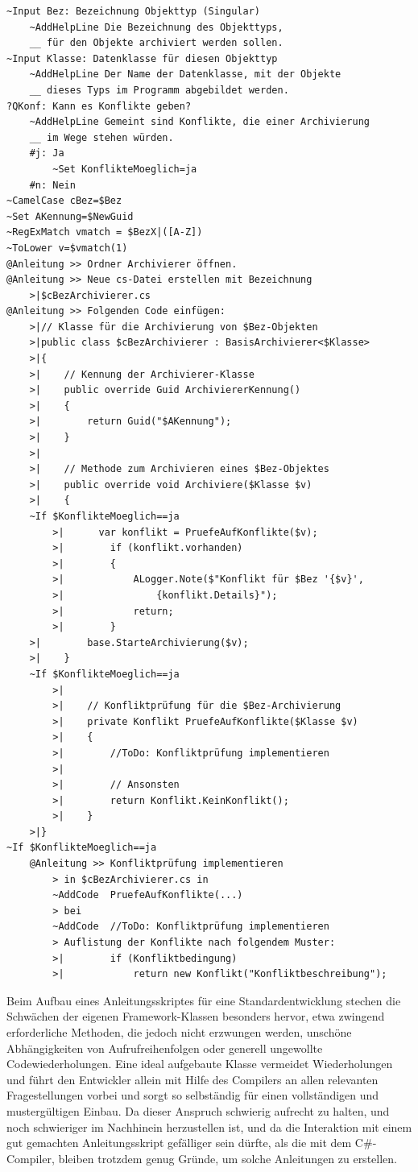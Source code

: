 \label{Archivklasse2}
\begin{verbatim}
~Input Bez: Bezeichnung Objekttyp (Singular)
    ~AddHelpLine Die Bezeichnung des Objekttyps,
    __ für den Objekte archiviert werden sollen.
~Input Klasse: Datenklasse für diesen Objekttyp
    ~AddHelpLine Der Name der Datenklasse, mit der Objekte
    __ dieses Typs im Programm abgebildet werden.
?QKonf: Kann es Konflikte geben?
    ~AddHelpLine Gemeint sind Konflikte, die einer Archivierung
    __ im Wege stehen würden.
    #j: Ja
        ~Set KonflikteMoeglich=ja
    #n: Nein
~CamelCase cBez=$Bez
~Set AKennung=$NewGuid
~RegExMatch vmatch = $BezX|([A-Z])
~ToLower v=$vmatch(1)
@Anleitung >> Ordner Archivierer öffnen.
@Anleitung >> Neue cs-Datei erstellen mit Bezeichnung
    >|$cBezArchivierer.cs
@Anleitung >> Folgenden Code einfügen:
    >|// Klasse für die Archivierung von $Bez-Objekten
    >|public class $cBezArchivierer : BasisArchivierer<$Klasse>
    >|{
    >|    // Kennung der Archivierer-Klasse
    >|    public override Guid ArchiviererKennung()
    >|    {
    >|        return Guid("$AKennung");
    >|    }
    >|
    >|    // Methode zum Archivieren eines $Bez-Objektes
    >|    public override void Archiviere($Klasse $v)
    >|    {
    ~If $KonflikteMoeglich==ja
        >|      var konflikt = PruefeAufKonflikte($v);
        >|        if (konflikt.vorhanden)
        >|        {
        >|            ALogger.Note($"Konflikt für $Bez '{$v}', 
        >|                {konflikt.Details}");
        >|            return;
        >|        }
    >|        base.StarteArchivierung($v);
    >|    }
    ~If $KonflikteMoeglich==ja
        >|    
        >|    // Konfliktprüfung für die $Bez-Archivierung
        >|    private Konflikt PruefeAufKonflikte($Klasse $v)
        >|    {
        >|        //ToDo: Konfliktprüfung implementieren
        >|        
        >|        // Ansonsten
        >|        return Konflikt.KeinKonflikt();
        >|    }
    >|}
~If $KonflikteMoeglich==ja
    @Anleitung >> Konfliktprüfung implementieren
        > in $cBezArchivierer.cs in
        ~AddCode  PruefeAufKonflikte(...)
        > bei
        ~AddCode  //ToDo: Konfliktprüfung implementieren
        > Auflistung der Konflikte nach folgendem Muster:
        >|        if (Konfliktbedingung)
        >|            return new Konflikt("Konfliktbeschreibung");
\end{verbatim}

Beim Aufbau eines Anleitungsskriptes für eine Standardentwicklung stechen die Schwächen der eigenen Framework-Klassen besonders hervor, etwa zwingend erforderliche Methoden, die jedoch nicht erzwungen werden, unschöne Abhängigkeiten von Aufrufreihenfolgen oder generell ungewollte Codewiederholungen. Eine ideal aufgebaute Klasse vermeidet Wiederholungen und führt den Entwickler allein mit Hilfe des Compilers an allen relevanten Fragestellungen vorbei und sorgt so selbständig für einen vollständigen und mustergültigen Einbau. Da dieser Anspruch schwierig aufrecht zu halten, und noch schwieriger im Nachhinein herzustellen ist, und da die Interaktion mit einem gut gemachten Anleitungsskript gefälliger sein dürfte, als die mit dem C\#-Compiler, bleiben trotzdem genug Gründe, um solche Anleitungen zu erstellen.


